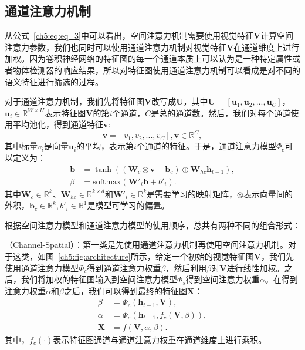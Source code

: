 \subsection{通道注意力机制}
从公式~\eqref{ch5:eq:eq_3}中可以看出，空间注意力机制需要使用视觉特征$\bm{V}$计算空间注意力参数，我们也同时可以使用通道注意力机制对视觉特征$\bm{V}$在通道维度上进行加权。因为卷积神经网络的特征图的每一个通道本质上可以认为是一种特定属性或者物体检测器的响应结果，所以对特征图使用通道注意力机制可以看成是对不同的语义特征进行筛选的过程。

对于通道注意力机制，我们先将特征图$\bm{V}$改写成$\bm{U}$，其中$\bm{U} = [\bm{u}_1, \bm{u}_2, ..., \bm{u}_C]$，$\bm{u}_i \in \mathbb{R}^{W \times H}$表示特征图$\bm{V}$的第$i$个通道，$C$是总的通道数。然后，我们对每个通道使用平均池化，得到通道特征$\bm{v}$:
\begin{equation}
\bm{v} = \left[v_1, v_2, ..., v_C \right], \bm{v} \in \mathbb{R}^{C},
\end{equation}
其中标量$v_i$是向量$\bm{u}_i$的平均，表示第$i$个通道的特征。于是，通道注意力模型$\Phi_c$可以定义为：
\begin{equation} \label{ch5:eq:eq_7}
\begin{split}
\bm{b} & = \tanh \left(\left(\bm{W}_c \otimes \bm{v} + \bm{b}_c \right) \oplus \bm{W}_{hc}\bm{h}_{t-1} \right), \\
\beta & = \textrm{softmax} \left(\bm{W'}_i \bm{b} + {b'}_i \right).
\end{split}
\end{equation}
其中$\bm{W}_c \in \mathbb{R}^k$、$\bm{W}_{hc} \in \mathbb{R}^{k \times d}$和$\bm{W'}_i \in \mathbb{R}^k$是需要学习的映射矩阵，$\otimes$表示向量间的外积，$\bm{b}_c \in \mathbb{R}^k, {b'}_i \in \mathbb{R}^1$是模型可学习的偏置。


根据空间注意力模型和通道注意力模型的使用顺序，总共有两种不同的组合形式：

\textbf{}（Channel-Spatial）：第一类是先使用通道注意力机制再使用空间注意力机制。对于这类，如图~\ref{ch5:fig:architecture}所示，给定一个初始的视觉特征图$\bm{V}$，我们先使用通道注意力模型$\Phi_c$得到通道注意力权重$\beta$，然后利用$\beta$对$\bm{V}$进行线性加权。之后，我们将加权的特征图输入到空间注意力模型$\Phi_s$得到空间注意力权重$\alpha$。在得到注意力权重$\alpha$和$\beta$之后，我们可以得到最终的特征图$\bm{X}$：
\begin{equation} \label{ch5:eq:eq_8}
\begin{split}
\beta &= \Phi_c \left(\bm{h}_{t-1},\bm{V} \right), \\
\alpha &= \Phi_s \left(\bm{h}_{t-1}, f_c \left(\bm{V}, \beta \right) \right), \\
\bm{X} &= f \left(\bm{V}, \alpha, \beta \right).
\end{split}
\end{equation}
其中，$f_c(\cdot)$表示特征图通道与通道注意力权重在通道维度上进行乘积。


